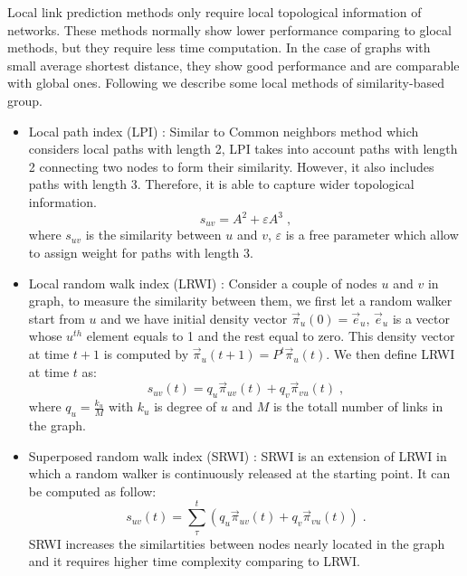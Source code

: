 \documentclass{article}
\begin{document}
Local link prediction methods only require local topological information of networks. These methods normally show lower performance comparing to glocal methods, but they require less time computation. In the case of graphs with small average shortest distance, they show good performance and are comparable with global ones. Following we describe some local methods of similarity-based group.

\begin{itemize}
\item Local path index (LPI) \cite{lpi1, lpi2}: Similar to Common neighbors method \cite{cn} which considers local paths with length 2, LPI takes into account paths with length 2 connecting two nodes to form their similarity. However, it also includes paths with length 3. Therefore, it is able to capture wider topological information.
\begin{equation}
s_{uv} = A^2 + \varepsilon A^3\; ,
\end{equation}
where $s_{uv}$ is the similarity between $u$ and $v$, $\varepsilon$ is a free parameter which allow to assign weight for paths with length 3.

\item Local random walk index (LRWI) \cite{lrwi-srwi}: Consider a couple of nodes $u$ and $v$ in graph, to measure the similarity between them, we first let a random walker start from $u$ and we have initial density vector $\overrightarrow{\pi}_u(0) = \overrightarrow{e}_u$, $\overrightarrow{e}_u$ is a vector whose $u^{th}$ element equals to 1 and the rest equal to zero. This density vector at time $t+1$ is computed by $\overrightarrow{\pi}_u(t+1) = P^t \overrightarrow{\pi}_u(t)$. We then define LRWI at time $t$ as:
\begin{equation}
s_{uv}(t) = q_u \overrightarrow{\pi}_{uv}(t) + q_v \overrightarrow{\pi}_{vu}(t)\; ,
\end{equation}
where $q_u = \frac{k_u}{M}$ with $k_u$ is degree of $u$ and $M$ is the totall number of links in the graph.

\item Superposed random walk index (SRWI) \cite{lrwi-srwi}: SRWI is an extension of LRWI in which a random walker is continuously released at the starting point. It can be computed as follow:
\begin{equation}
s_{uv}(t) = \sum_{\tau}^{t}{(q_u \overrightarrow{\pi}_{uv}(t) + q_v \overrightarrow{\pi}_{vu}(t))} \; .
\end{equation}
SRWI increases the similartities between nodes nearly located in the graph and it requires higher time complexity comparing to LRWI.
\end{itemize}
\end{document}
